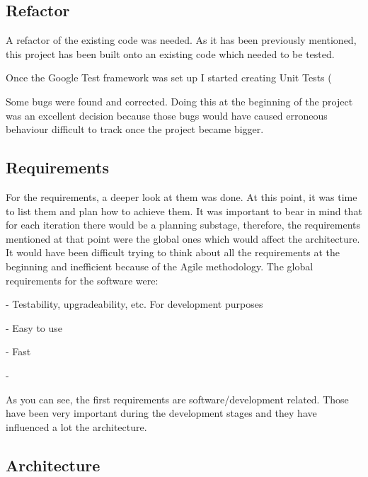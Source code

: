 \subsection{Refactor}

A refactor of the existing code was needed. As it has been previously mentioned, this project has been built onto an existing code which needed to be tested.  



Once the Google Test framework was set up I started creating Unit Tests (%






Some bugs were found and corrected. Doing this at the beginning of the project was an excellent decision because those bugs would have caused erroneous behaviour difficult to track once the project became bigger. 

\subsection{Requirements}
For the requirements, a deeper look at them was done. At this point, it was time to list them and plan how to achieve them. It was important to bear in mind that for each iteration there would be a planning substage, therefore, the requirements mentioned at that point were the global ones which would affect the architecture. It would have been difficult trying to think about all the requirements at the beginning and inefficient because of the Agile methodology. The global requirements for the software were: 

- Testability, upgradeability, etc. For development purposes 

- Easy to use 

- Fast 

- %



As you can see, the first requirements are software/development related. Those have been very important during the development stages and they have influenced a lot the architecture.  

\subsection{Architecture}

